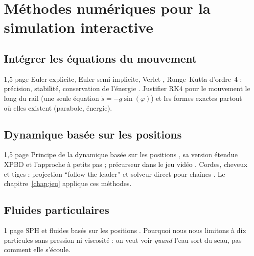 
\chapter{Méthodes numériques pour la simulation interactive}
\label{chap:methodes}

\section{Intégrer les équations du mouvement}

\begin{arediger}{1,5 page}
Euler explicite, Euler semi-implicite, Verlet \parencite{verlet1967},
Runge--Kutta d'ordre~4 \parencite{butcher2016} ; précision, stabilité,
conservation de l'énergie \parencite{hairer2006}. Justifier RK4 pour le
mouvement le long du rail (une seule équation \(\ddot{s} = -g \sin(\varphi)\))
et les formes exactes partout où elles existent (parabole, énergie).
\end{arediger}

\section{Dynamique basée sur les positions}

\begin{arediger}{1,5 page}
Principe de la dynamique basée sur les positions \parencite{muller2007pbd,
bender2014survey}, sa version étendue XPBD \parencite{macklin2016xpbd} et
l'approche à petits pas \parencite{macklin2019smallsteps} ; précurseur dans le
jeu vidéo \parencite{jakobsen2001}. Cordes, cheveux et tiges : projection
\enquote{follow-the-leader} \parencite{muller2012ftl} et solveur direct pour
chaînes \parencite{deul2018direct}. Le chapitre~\ref{chap:jeu} applique ces
méthodes.
\end{arediger}

\section{Fluides particulaires}

\begin{arediger}{1 page}
SPH \parencite{monaghan1992sph} et fluides basés sur les positions
\parencite{macklin2013pbf}. Pourquoi nous nous limitons à dix particules sans
pression ni viscosité : on veut voir \emph{quand} l'eau sort du seau, pas
comment elle s'écoule.
\end{arediger}
